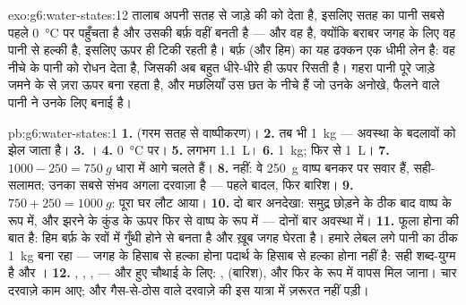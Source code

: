 \begin{solution}{exo:g6:water-states:12}
तालाब अपनी सतह से जाड़े की  को  देता है, इसलिए सतह का पानी
सबसे पहले \qty{0}{\celsius} पर पहुँचता है और उसकी बर्फ़ वहीं बनती है
--- और वह  है, क्योंकि बराबर जगह के लिए वह पानी से हल्की है,
इसलिए ऊपर ही टिकी रहती है। बर्फ़ (और हिम) का यह ढक्कन एक धीमी लेन है:
वह नीचे के पानी को रोधन देता है, जिसकी  अब बहुत धीरे-धीरे ही ऊपर
रिसती है। गहरा पानी पूरे जाड़े जमने के  से ज़रा ऊपर बना रहता है, और
मछलियाँ उस छत के नीचे  हैं जो उनके अनोखे, फैलने वाले पानी ने
उनके लिए बनाई है।
\end{solution}

\begin{solution}{pb:g6:water-states:1}
\textbf{1.}  (गरम सतह से वाष्पीकरण)।
\textbf{2.} तब भी \qty{1}{kg} ---  अवस्था के बदलावों को झेल
जाता है।
\textbf{3.} ।
\textbf{4.} \qty{0}{\celsius} पर।
\textbf{5.} लगभग \qty{1.1}{L}।
\textbf{6.}  \qty{1}{kg};  फिर से \qty{1}{L}।
\textbf{7.} $1000 - 250 = \qty{750}{g}$ धारा में आगे चलते हैं।
\textbf{8.} नहीं: वे \qty{250}{g} वाष्प बनकर  पर सवार हैं,
सही-सलामत; उनका सबसे संभव अगला दरवाज़ा  है --- पहले बादल, फिर
बारिश।
\textbf{9.} $750 + 250 = \qty{1000}{g}$: पूरा  घर लौट आया।
\textbf{10.} दो बार अनदेखा: समुद्र छोड़ने के ठीक बाद वाष्प के रूप में,
और झरने के कुंड के ऊपर फिर से वाष्प के रूप में --- दोनों बार 
अवस्था में।
\textbf{11.} फूला होना \emph{} की बात है: हिम बर्फ़ के रवों में
 गुँथी होने से बनता है और ख़ूब जगह घेरता है। हमारे लेबल लगे पानी का
\emph{} ठीक \qty{1}{kg} बना रहा --- जगह के हिसाब से हल्का
होना पदार्थ के हिसाब से हल्का होना नहीं है: सही शब्द-युग्म है
 और ।
\textbf{12.} , , ,  --- और  हुए चौथाई के
लिए: ,  (बारिश), और फिर  के रूप में वापस मिल जाना। चार
दरवाज़े काम आए;  और गैस-से-ठोस वाले दरवाज़े की इस यात्रा में
ज़रूरत नहीं पड़ी।
\end{solution}
